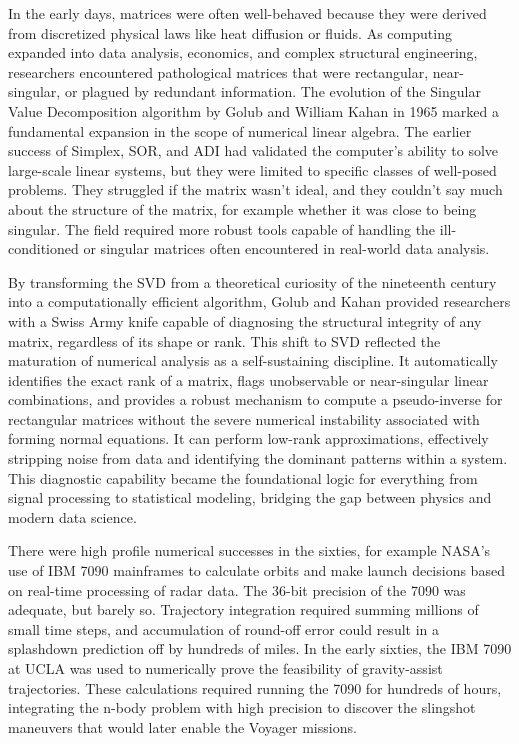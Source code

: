 In the early days, matrices were often well-behaved because they were derived from discretized physical laws like heat diffusion or fluids. As computing expanded into data analysis, economics, and complex structural engineering, researchers encountered pathological matrices that were rectangular, near-singular, or plagued by redundant information. The evolution of the Singular Value Decomposition algorithm by Golub and William Kahan in 1965 marked a fundamental expansion in the scope of numerical linear algebra. The earlier success of Simplex, SOR, and ADI had validated the computer's ability to solve large-scale linear systems, but they were limited to specific classes of well-posed problems. They struggled if the matrix wasn't ideal, and they couldn't say much about the structure of the matrix, for example whether it was close to being singular. The field required more robust tools capable of handling the ill-conditioned or singular matrices often encountered in real-world data analysis. 

By transforming the SVD from a theoretical curiosity of the nineteenth century into a computationally efficient algorithm, Golub and Kahan provided researchers with a Swiss Army knife capable of diagnosing the structural integrity of any matrix, regardless of its shape or rank. This shift to SVD reflected the maturation of numerical analysis as a self-sustaining discipline. It automatically identifies the exact rank of a matrix, flags unobservable or near-singular linear combinations, and provides a robust mechanism to compute a pseudo-inverse for rectangular matrices without the severe numerical instability associated with forming normal equations. It can perform low-rank approximations, effectively stripping noise from data and identifying the dominant patterns within a system. This diagnostic capability became the foundational logic for everything from signal processing to statistical modeling, bridging the gap between physics and modern data science. 

There were high profile numerical successes in the sixties, for example NASA’s use of IBM 7090 mainframes to calculate orbits and make launch decisions based on real-time processing of radar data. The 36-bit precision of the 7090 was adequate, but barely so. Trajectory integration required summing millions of small time steps, and accumulation of round-off error could result in a splashdown prediction off by hundreds of miles. In the early sixties, the IBM 7090 at UCLA was used to numerically prove the feasibility of gravity-assist trajectories. These calculations required running the 7090 for hundreds of hours, integrating the n-body problem with high precision to discover the slingshot maneuvers that would later enable the Voyager missions. 

